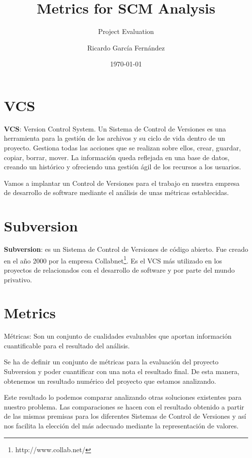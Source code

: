 \documentclass[11pt]{scrartcl}
\title{\textbf{Metrics for SCM Analysis}}
\subtitle{Project Evaluation}
\author{Ricardo Garc\'ia Fern\'andez}
\date{\today}
\begin{document}
\maketitle

\tableofcontents

\newpage

\section{VCS}

\par \textbf{VCS}: Version Control System. Un Sistema de Control de Versiones es una herramienta para la gesti\'on de los archivos y su ciclo de vida dentro de un proyecto. Gestiona todas las acciones que se realizan sobre ellos, crear, guardar, copiar, borrar, mover. La informaci\'on queda reflejada en una base de datos, creando un hist\'orico y ofreciendo una gesti\'on \'agil de los recursos a los usuarios.

\par Vamos a implantar un Control de Versiones para el trabajo en nuestra empresa de desarrollo de software mediante el an\'alisis de unas m\'etricas establecidas.

\section{Subversion}

\textbf{Subversion}: es un Sistema de Control de Versiones de c\'odigo abierto.
Fue creado en el a\~no 2000 por la empresa Collabnet\footnote{http://www.collab.net/}.
Es el VCS m\'as utilizado en los proyectos de relacionados con el desarrollo de software y por parte del mundo privativo.

\section{Metrics}

M\'etricas: Son un conjunto de cualidades evaluables que aportan informaci\'on cuantificable para el resultado del an\'alisis.

\par Se ha de definir un conjunto de m\'etricas para la evaluaci\'on del proyecto Subversion y poder cuantificar con una nota el resultado final. De esta manera, obtenemos un resultado num\'erico del proyecto que estamos analizando.

\par Este resultado lo podemos comparar analizando otras soluciones existentes para nuestro problema.
Las comparaciones se hacen con el resultado obtenido a partir de las mismas premisas para los diferentes Sistemas de Control de Versiones y así nos facilita la elecci\'on del m\'as adecuado mediante la representaci\'on de valores.
\end{document}
